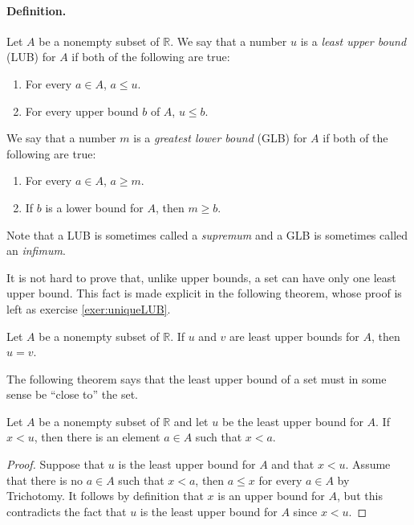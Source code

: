 \paragraph{Definition.} Let $A$ be a nonempty subset of $\mathbb R$. We say that a number $u$ is a \emph{least upper bound} (LUB)  for $A$ if both of the following are true:
\begin{enumerate}
\item For every $a\in A$, $a\leq u$.
\item For every upper bound $b$ of $A$, $u\leq b$.
\end{enumerate}
We say that a number $m$ is a \emph{greatest lower bound} (GLB) for $A$ if both of the following are true:
\begin{enumerate}
\item For every $a\in A$, $a\geq m$.
\item If $b$ is a lower bound for $A$, then $m\geq b$.
\end{enumerate}
Note that a LUB is sometimes called a \emph{supremum} and a GLB is sometimes called an \emph{infimum}.

It is not hard to prove that, unlike upper bounds, a set can have only one least upper bound. This fact is made explicit in the following theorem, whose proof is left as exercise \ref{exer:uniqueLUB}.

\begin{thrm} \label{thrm:uniquelub}
Let $A$ be a nonempty subset of $\mathbb R$. If $u$ and $v$ are least upper bounds for $A$, then $u=v$.
\end{thrm}

The following theorem says that the least upper bound of a set must in some sense be ``close to'' the set.

\begin{thrm} \label{thrm:lubclose}
Let $A$ be a nonempty subset of $\mathbb R$ and let $u$ be the least upper bound for $A$. If $x<u$, then there is an element $a\in A$ such that $x<a$.
\end{thrm}

\begin{proof}
Suppose that $u$ is the least upper bound for $A$ and that $x<u$. Assume that there is no $a\in A$ such that $x<a$, then $a\leq x$ for every $a\in A$ by Trichotomy. It follows by definition that $x$ is an upper bound for $A$, but this contradicts the fact that $u$ is the least upper bound for $A$ since $x<u$.
\end{proof}

